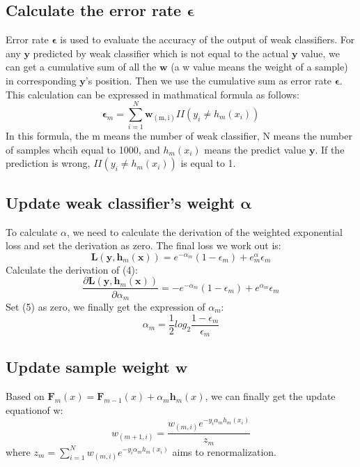 \documentclass[journal, a4paper]{IEEEtran}
\begin{document}
\subsection{Calculate the error rate $\boldsymbol{\epsilon}$}
Error rate $\boldsymbol{\epsilon}$ is used to evaluate the accuracy of the output of weak classifiers. For any $\boldsymbol{y}$ predicted by weak classifier which is not equal to the actual $\boldsymbol{y}$ value, we can get a cumulative sum of all the $\boldsymbol{w}$ (a w value means the weight of a sample) in corresponding  $\boldsymbol{y}$'s position. Then we use the cumulative sum as error rate $\boldsymbol{\epsilon}$. This calculation can be expressed in mathmatical formula as follows:
\begin{equation}
	\boldsymbol{\epsilon}_m=\sum_{i=1}^N \boldsymbol{w}_\mathrm{(m,i)}II(y_i\ne h_m(x_i))
\end{equation}
In this formula, the m means the number of weak classifier, N means the number of samples whcih equal to 1000, and $h_m(x_i)$ means the predict value $\boldsymbol{y}$. If the prediction is wrong, $II(y_i\ne h_m(x_i))$ is equal to 1.
\par 

\subsection{Update weak classifier's weight $\boldsymbol{\alpha}$}
To calculate $\alpha$, we need to calculate the derivation of the weighted exponential loss and set the derivation as zero. The final loss we work out is:
\begin{equation}
	\boldsymbol{L}(\boldsymbol{y},\boldsymbol{h}_m(\boldsymbol{x}))=e^{-\alpha_m} (1-\epsilon_m)+e^\alpha_m \epsilon_m
\end{equation} 
Calculate the derivation of (4):
\begin{equation}
	 \frac{\partial \boldsymbol{L}(\boldsymbol{y},\boldsymbol{h}_m(\boldsymbol{x}))}{\partial \alpha_m}=-e^{-\alpha_m}(1-\epsilon_m)+e^{\alpha_m}\epsilon_m
\end{equation}
Set (5) as zero, we finally get the expression of $\alpha_m$:
\begin{equation}
	\alpha_m= \frac{1}{2}log_2 \frac{1-\epsilon_m}{\epsilon_m}
\end{equation}

\subsection{Update sample weight $\boldsymbol{w}$}
Based on $\boldsymbol{F}_m(x)=\boldsymbol{F}_{m-1}(x)+\alpha_m\boldsymbol{h}_m(x)$, we can finally get the update equationof w:
\begin{equation}
	w_{(m+1,i)}=\frac{w_{(m,i)}e^{-y_i\alpha_mh_m(x_i)}}{z_m}
\end{equation}
where $z_m=\sum_{i=1}^Nw_{(m,i)}e^{-y_i\alpha_mh_m(x_i)}$ aims to renormalization.
\end{document}
